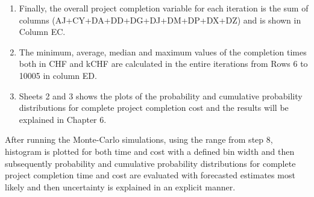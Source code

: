\begin{enumerate}
	\item Finally, the overall project completion variable for each iteration is the sum of columns (AJ+CY+DA+DD+DG+DJ+DM+DP+DX+DZ) and is shown in Column EC.
	
	\item The minimum, average, median and maximum values of the completion times both in CHF and kCHF are calculated in the entire iterations from Rows 6 to 10005 in column ED.
	
	\item Sheets 2 and 3 shows the plots of the probability and cumulative probability distributions for complete project completion cost and the results will be explained in Chapter 6.
	
	
\end{enumerate}

After running the Monte-Carlo simulations, using the range from step 8, histogram is plotted for both time and cost with a defined bin width and then subsequently probability and cumulative probability distributions for complete project completion time and cost are evaluated with forecasted estimates most likely and then uncertainty is explained in an explicit manner.

